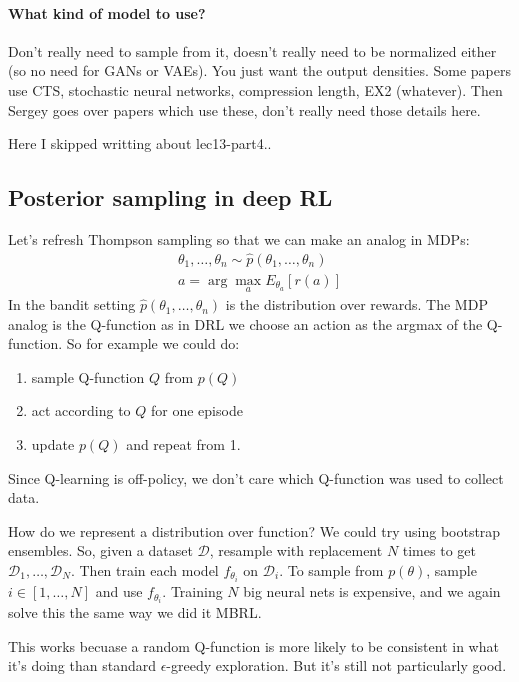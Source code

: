 \documentclass{report}
\newcommand{\argmax}{\arg\!\max}
\begin{document}
\paragraph{What kind of model to use?}
Don't really need to sample from it, doesn't really need to be normalized either (so no need for GANs or VAEs).
You just want the output densities. 
Some papers use CTS, stochastic neural networks, compression length, EX2 (whatever).
Then Sergey goes over papers which use these, don't really need those details here.

Here I skipped writting about lec13-part4..

\subsection{Posterior sampling in deep RL}
Let's refresh Thompson sampling so that we can make an analog in MDPs:
\begin{gather}
		\theta_1, \dots, \theta_n \sim \hat{p} (\theta_1, \dots, \theta_n) \\
		a = \argmax_a E_{\theta_a} \left[ r(a) \right] 
\end{gather}
In the bandit setting $ \hat{p}(\theta_1, \dots, \theta_n)  $ is the distribution over rewards.
The MDP analog is the Q-function as in DRL we choose an action as the argmax of the Q-function.
So for example we could do:
\begin{enumerate}
		\item sample Q-function $Q$ from $p(Q)$
		\item act according to $Q$ for one episode
		\item update $p(Q)$ and repeat from 1.
\end{enumerate}
Since Q-learning is off-policy, we don't care which Q-function was used to collect data.

How do we represent a distribution over function?
We could try using bootstrap ensembles.
So, given a dataset $\mathcal{D}$, resample with replacement $N$ times to get $\mathcal{D}_1, \dots, \mathcal{D}_N$.
Then train each model $f_{\theta_i}$ on $ \mathcal{D}_i  $.
To sample from $ p(\theta)  $, sample $ i \in [1, \dots, N]  $ and use $ f_{\theta_i}  $.
Training $N$ big neural nets is expensive, and we again solve this the same way we did it MBRL.

This works becuase a random Q-function is more likely to be consistent in what it's doing than
standard $\epsilon$-greedy exploration. But it's still not particularly good.
\end{document}
